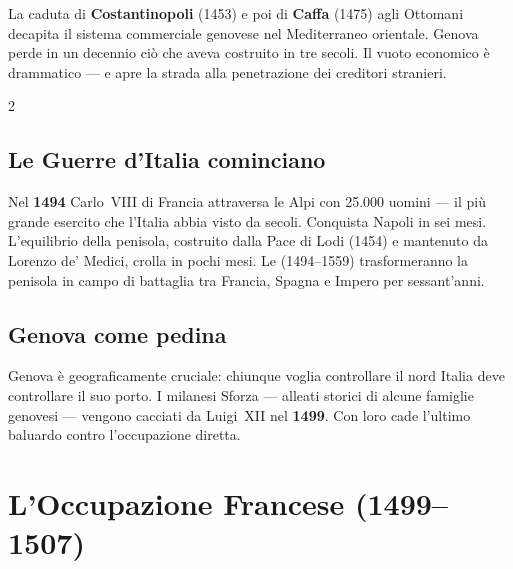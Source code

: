La caduta di \textbf{Costantinopoli} (1453) e poi di \textbf{Caffa} (1475)
agli Ottomani decapita il sistema commerciale genovese nel Mediterraneo
orientale. Genova perde in un decennio ciò che aveva costruito in tre
secoli. Il vuoto economico è drammatico — e apre la strada alla
penetrazione dei creditori stranieri.

\begin{multicols}{2}

\subsection{Le Guerre d'Italia cominciano}


Nel \textbf{1494} Carlo~VIII di Francia attraversa le Alpi con 25.000
uomini — il più grande esercito che l'Italia abbia visto da secoli.
Conquista Napoli in sei mesi. L'equilibrio della penisola, costruito
dalla Pace di Lodi (1454) e mantenuto da Lorenzo de' Medici, crolla
in pochi mesi. Le  (1494–1559) trasformeranno
la penisola in campo di battaglia tra Francia, Spagna e Impero per
sessant'anni.

\columnbreak

\subsection{Genova come pedina}

Genova è geograficamente cruciale: chiunque voglia controllare il nord
Italia deve controllare il suo porto. I milanesi Sforza — alleati
storici di alcune famiglie genovesi — vengono cacciati da Luigi~XII
nel \textbf{1499}. Con loro cade l'ultimo baluardo contro l'occupazione
diretta.


\end{multicols}

\section{L'Occupazione Francese (1499–1507)}
\label{sec:occupazione}


